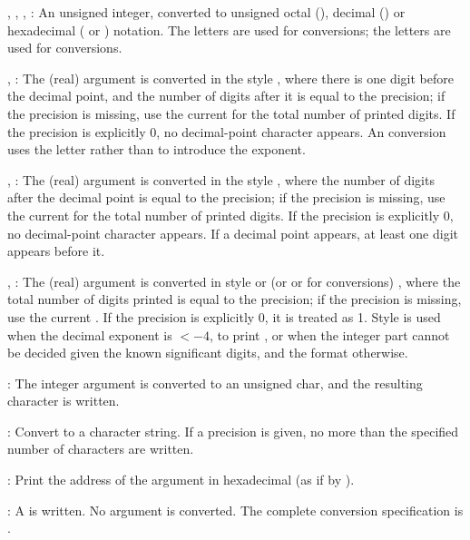\item {}, , , : An unsigned integer, converted
to unsigned octal (), decimal () or hexadecimal ( or
) notation. The letters  are used for 
conversions;  the letters  are used for  conversions.

\item {}, : The (real) argument is converted in the style
, where there is one digit before the decimal point,
and the number of digits after it is equal to the precision; if the
precision is missing, use the current  for the total
number of printed digits. If the precision is explicitly 0, no decimal-point
character appears. An  conversion uses the letter  rather
than  to introduce the exponent.

\item {}, : The (real) argument is converted in the style
, where the number of digits after the decimal point
is equal to the precision; if the precision is missing, use the current
 for the total number of printed digits. If the precision
is explicitly 0, no decimal-point character appears. If a decimal point
appears, at least one digit appears before it.

\item {}, : The (real) argument is converted in style
 or  (or  or  for  conversions)
, where the total number of digits printed
is equal to the precision; if the precision is missing, use the current
. If the precision is explicitly 0, it is treated as 1.
Style  is used when
the decimal exponent is $< -4$, to print , or when the integer
part cannot be decided given the known significant digits, and the 
format otherwise.

\item {}: The integer argument is converted to an unsigned char, and the
resulting character is written.

\item {}: Convert to a character string. If a precision is given, no
more than the specified number of characters are written.

\item {}: Print the address of the argument in hexadecimal (as if by
).

\item \kbd{\%}: A \kbd{\%} is written. No argument is converted. The complete
conversion specification is \kbd{\%\%}.

